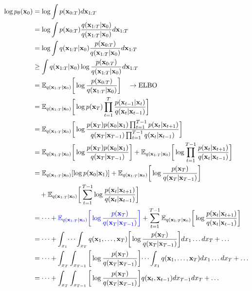 \begin{align}
\log p_\theta(\rvx_0) &=  \log\int p(\rvx_{0:T})d\rvx_{1:T}\\
	&= \log\int p(\rvx_{0:T})\frac{q(\rvx_{1:T}|\rvx_0)}{q(\rvx_{1:T}|\rvx_0)}d\rvx_{1:T}\\
	&= \log\int q(\rvx_{1:T}|\rvx_0)\frac{p(\rvx_{0:T})}{q(\rvx_{1:T}|\rvx_0)}d\rvx_{1:T}\\
	&\geq \int q(\rvx_{1:T}|\rvx_0)\log\frac{p(\rvx_{0:T})}{q(\rvx_{1:T}|\rvx_0)}d\rvx_{1:T}\\
	&= \mathbb{E}_{q(\rvx_{1:T}|\rvx_0)}\bigg[\log\frac{p(\rvx_{0:T})}{q(\rvx_{1:T}|\rvx_0)}\bigg] \quad \to \textrm{ELBO}\\
	&= \mathbb{E}_{q(\rvx_{1:T}|\rvx_0)}\bigg[\log p(\rvx_T)\prod_{t=1}^T\frac{p(\rvx_{t-1}|\rvx_t)}{q(\rvx_{t}|\rvx_{t-1})}\bigg]\\
	&= \mathbb{E}_{q(\rvx_{1:T}|\rvx_0)}\bigg[\log \frac{p(\rvx_T)p(\rvx_0|\rvx_{1})\prod_{t=1}^{T-1} p(\rvx_{t}|\rvx_{t+1})}{q(\rvx_T|\rvx_{T-1})\prod_{t=1}^{T-1}  q(\rvx_{t}|\rvx_{t-1})}\bigg]\\
	&= \mathbb{E}_{q(\rvx_{1:T}|\rvx_0)}\bigg[\log \frac{p(\rvx_T)p(\rvx_0|\rvx_{1})}{q(\rvx_T|\rvx_{T-1})}\bigg] + \mathbb{E}_{q(\rvx_{1:T}|\rvx_0)}\bigg[\log \prod_{t=1}^{T-1}\frac{ p(\rvx_{t}|\rvx_{t+1})}{q(\rvx_{t}|\rvx_{t-1})}\bigg]\\
	&= \mathbb{E}_{q(\rvx_{1:T}|\rvx_0)}[\log p(\rvx_0|\rvx_{1})]+\mathbb{E}_{q(\rvx_{1:T}|\rvx_0)}\bigg[\log \frac{p(\rvx_T)}{q(\rvx_T|\rvx_{T-1})}\bigg]\\ 
	&\quad + \mathbb{E}_{q(\rvx_{1:T}|\rvx_0)}\bigg[\sum_{t=1}^{T-1}\log \frac{ p(\rvx_{t}|\rvx_{t+1})}{q(\rvx_{t}|\rvx_{t-1})}\bigg]\\
	&= \dots + \blue{\mathbb{E}_{q(\rvx_{1:T}|\rvx_0)}\bigg[\log \frac{p(\rvx_T)}{q(\rvx_T|\rvx_{T-1})}\bigg]} + \sum_{t=1}^{T-1}\mathbb{E}_{q(\rvx_{1:T}|\rvx_0)}\bigg[\log \frac{ p(\rvx_{t}|\rvx_{t+1})}{q(\rvx_{t}|\rvx_{t-1})}\bigg]\\
	&= \dots + \int_{x_1}\dots\int_{x_T}q(\rvx_{1},\dots,\rvx_{T})\bigg[\log \frac{p(\rvx_T)}{q(\rvx_T|\rvx_{T-1})}\bigg]dx_1\dots dx_T + \dots\\
	&= \dots + \int_{x_T}\int_{x_{T-1}}\bigg[\log \frac{p(\rvx_T)}{q(\rvx_T|\rvx_{T-1})}\bigg]\dots\int_{x_1} q(\rvx_{1},\dots,\rvx_{T})dx_1\dots dx_T + \dots\\
	&= \dots + \int_{x_T}\int_{x_{T-1}}\bigg[\log \frac{p(\rvx_T)}{q(\rvx_T|\rvx_{T-1})}\bigg] q(\rvx_{t},\rvx_{t-1})dx_{T-1} dx_T + \dots\\

\end{align}
